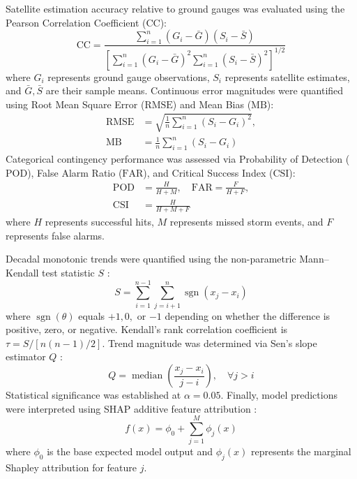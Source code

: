 \documentclass[conference]{IEEEtran}
\begin{document}
Satellite estimation accuracy relative to ground gauges was evaluated using the Pearson Correlation Coefficient ($\text{CC}$):
\begin{equation}
\text{CC} = \frac{\sum_{i=1}^{n} (G_i - \bar{G})(S_i - \bar{S})}{\left[ \sum_{i=1}^{n} (G_i - \bar{G})^2 \sum_{i=1}^{n} (S_i - \bar{S})^2 \right]^{1/2}}
\label{eq:cc}
\end{equation}
where $G_i$ represents ground gauge observations, $S_i$ represents satellite estimates, and $\bar{G}, \bar{S}$ are their sample means. Continuous error magnitudes were quantified using Root Mean Square Error ($\text{RMSE}$) and Mean Bias ($\text{MB}$):
\begin{equation}
\begin{aligned}
\text{RMSE} &= \sqrt{\frac{1}{n} \sum_{i=1}^{n} (S_i - G_i)^2}, \\
\text{MB} &= \frac{1}{n} \sum_{i=1}^{n} (S_i - G_i)
\end{aligned}
\label{eq:rmse_mb}
\end{equation}
Categorical contingency performance was assessed via Probability of Detection ($\text{POD}$), False Alarm Ratio ($\text{FAR}$), and Critical Success Index ($\text{CSI}$):
\begin{equation}
\begin{aligned}
\text{POD} &= \frac{H}{H + M}, \quad \text{FAR} = \frac{F}{H + F}, \\
\text{CSI} &= \frac{H}{H + M + F}
\end{aligned}
\label{eq:pod_far_csi}
\end{equation}
where $H$ represents successful hits, $M$ represents missed storm events, and $F$ represents false alarms.

Decadal monotonic trends were quantified using the non-parametric Mann--Kendall test statistic $S$ \cite{gorelick2017, pedregosa2011}:
\begin{equation}
S = \sum_{i=1}^{n-1} \sum_{j=i+1}^{n} \operatorname{sgn}(x_j - x_i)
\label{eq:mk_s}
\end{equation}
where $\operatorname{sgn}(\theta)$ equals $+1, 0,$ or $-1$ depending on whether the difference is positive, zero, or negative. Kendall's rank correlation coefficient is $\tau = S / [n(n-1)/2]$. Trend magnitude was determined via Sen's slope estimator $Q$ \cite{sen1968}:
\begin{equation}
Q = \operatorname{median}\left( \frac{x_j - x_i}{j - i} \right), \quad \forall j > i
\label{eq:sen_slope}
\end{equation}
Statistical significance was established at $\alpha = 0.05$. Finally, model predictions were interpreted using SHAP additive feature attribution \cite{scirep2024, taylor2001}:
\begin{equation}
f(x) = \phi_0 + \sum_{j=1}^{M} \phi_j(x)
\label{eq:shap}
\end{equation}
where $\phi_0$ is the base expected model output and $\phi_j(x)$ represents the marginal Shapley attribution for feature $j$.
\end{document}
